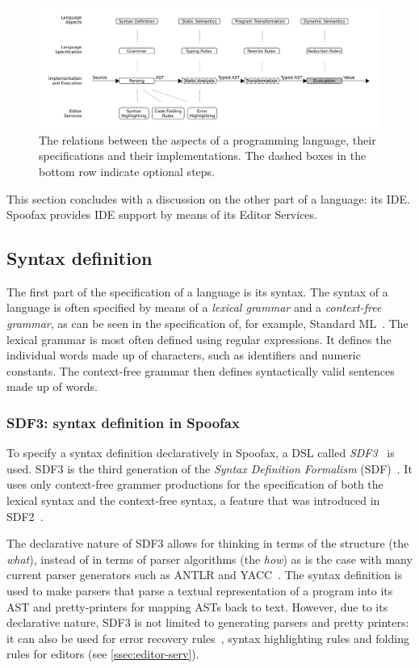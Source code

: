 \begin{figure}[t]
  \centering
  \includegraphics[width=\textwidth]{spoofax-relations}
  \caption{The relations between the aspects of a programming language, their
    specifications and their implementations. The dashed boxes in the bottom row
    indicate optional steps.}
  \label{fig:spoofax-relations}
\end{figure}

This section concludes with a discussion on the other part of a language: its
IDE. Spoofax provides IDE support by means of its Editor Services.

\subsection{Syntax definition}
\label{ssec:syntax-def}
The first part of the specification of a language is its syntax. The
syntax of a language is often specified by means of a \emph{lexical
grammar} and a \emph{context-free grammar}, as can be seen in the
specification of, for example, Standard ML~\cite{Milner97}. The
lexical grammar is most often defined using regular expressions. It
defines the individual words made up of characters, such as
identifiers and numeric constants. The context-free grammar then
defines syntactically valid sentences made up of words.

\subsubsection{SDF3: syntax definition in Spoofax}
\label{ssec:orgheadline1}
To specify a syntax definition declaratively in Spoofax, a DSL called
\emph{SDF3}~\cite{Vollebregt12} is used.  SDF3 is the third generation
of the \emph{Syntax Definition Formalism} (SDF)~\cite{Heering89}. It
uses only context-free grammer productions for the specification of
both the lexical syntax and the context-free syntax, a feature that
was introduced in SDF2~\cite{Visser97}.

The declarative nature of SDF3 allows for thinking in terms of the
structure (the \emph{what}), instead of in terms of parser algorithms (the
\emph{how}) as is the case with many current parser generators such as
ANTLR and YACC~\cite{Kats10b}. The syntax definition is used to
make parsers that parse a textual representation of a program into its
AST and pretty-printers for mapping ASTs back to text. However, due to
its declarative nature, SDF3 is not limited to generating parsers and
pretty printers: it can also be used for error recovery
rules~\cite{deJonge12}, syntax highlighting rules and folding
rules for editors (see \cref{ssec:editor-serv}).

